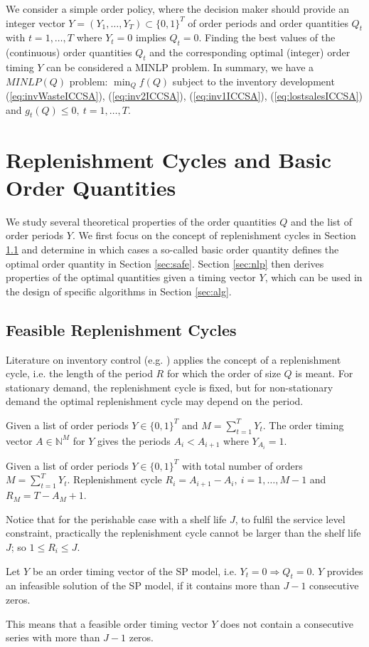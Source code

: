 %
We consider a simple order policy, where the decision maker should provide an integer vector $Y=(Y_1,\ldots,Y_T)\subset \{0,1\}^T$ of order periods and order quantities $Q_t$ with $t=1,\ldots,T$ where $Y_t=0$ implies $Q_t=0$. Finding the best values of the (continuous) order quantities $Q_t$ and the corresponding optimal (integer) order timing $Y$ can be considered a MINLP problem. In summary, we have a $MINLP (Q)$ problem:
$\min_Q f(Q)$
subject to the inventory development (\ref{eq:invWasteICCSA}), (\ref{eq:inv2ICCSA}), (\ref{eq:inv1ICCSA}), (\ref{eq:lostsalesICCSA}) and $g_t(Q)\le 0,\ t=1,\ldots,T$.




\section{Replenishment Cycles and Basic Order Quantities}
\label{sec:rcot}
%
We study several theoretical properties of the order quantities $Q$ and the list of order periods $Y$. We first focus on the concept of replenishment cycles in Section \ref{sec:repl} and determine in which cases a so-called basic order quantity defines the optimal order quantity in Section \ref{sec:safe}. Section \ref{sec:nlp} then derives properties of the optimal quantities given a timing vector $Y$, which can be used in the design of specific algorithms in Section \ref{sec:alg}.


\subsection{Feasible Replenishment Cycles}
\label{sec:repl}

Literature on inventory control (e.g. \cite{Silver98}) applies the concept of a replenishment cycle, i.e. the length of the period $R$ for which the order of size $Q$ is meant. For stationary demand, the replenishment cycle is fixed, but for non-stationary demand the optimal replenishment cycle may depend on the period.
 \begin{defn}
 \label{def:A}
Given a list of order periods $Y\in \{0,1\}^T$ and $M=\sum_{t=1}^T Y_t$. The order timing vector $A \in \mathbb{N}^M$ for $Y$ gives the periods $A_i< A_{i+1}$ where  $Y_{A_i}=1$.
\end{defn}
%
\begin{defn}
 \label{def:R}
Given a list of order periods $Y\in \{0,1\}^T$ with total number of orders $M=\sum_{t=1}^T Y_t$. Replenishment cycle $R_i=A_{i+1}-A_i, \ i=1,\ldots,M-1$ and $R_M=T-A_M+1$.
\end{defn}
Notice that for the perishable case with a shelf life $J$, to fulfil the service level constraint, practically the replenishment cycle cannot be larger than the shelf life $J$; so $1 \le R_i \le J$.
\begin{lemma}
\label{lem:Y}
Let $Y$ be an order timing vector of the SP model, i.e. $Y_t=0 \Rightarrow Q_t=0$. $Y$ provides an infeasible solution of the SP model, if it contains more than $J-1$ consecutive zeros.
\end{lemma}
This means that a feasible order timing vector $Y$ does not contain a consecutive series with more than $J-1$ zeros.

